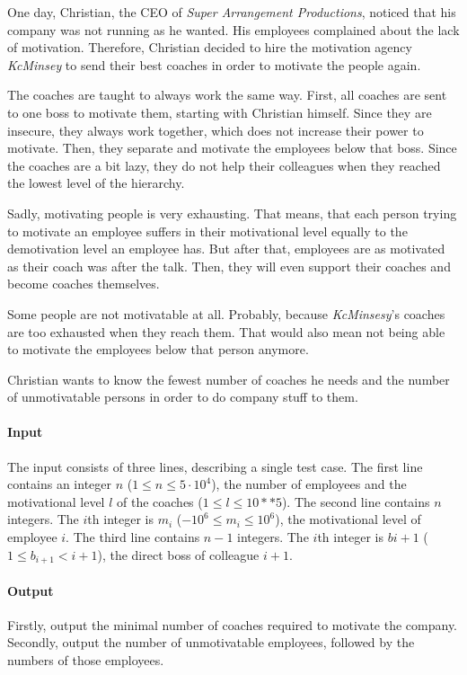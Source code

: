 



\makeheader

One day, Christian, the CEO of \textit{Super Arrangement Productions}, noticed that his company
was not running as he wanted. His employees complained about the lack of motivation.
Therefore, Christian decided to hire the motivation agency \textit{KcMinsey} to send their best
coaches in order to motivate the people again.

The coaches are taught to always work the same way. First, all coaches are sent to one boss to
motivate them, starting with Christian himself. Since they are insecure, they always work together,
which does not increase their power to motivate.
Then, they separate and motivate the employees below that boss. Since the coaches are a bit lazy,
they do not help their colleagues when they reached the lowest level of the hierarchy.

Sadly, motivating people is very exhausting. That means, that each person trying to motivate
an employee suffers in their motivational level equally to the demotivation level an employee
has. But after that, employees are as motivated as their coach was after the talk. Then,
they will even support their coaches and become coaches themselves.

Some people are not motivatable at all. Probably, because \textit{KcMinsesy}'s coaches
are too exhausted when they reach them. That would also mean not being able to motivate the
employees below that person anymore.

Christian wants to know the fewest number of coaches he needs and the number
of unmotivatable persons in order to do company stuff to them.

\paragraph*{Input}

The input consists of three lines, describing a single test case.
The first line contains an integer $n$ ($1 \leq n \leq 5 \cdot 10^4$), the number of employees and the motivational level $l$ of the coaches ($1 \leq l \leq 10**5$).
The second line contains $n$ integers. The $i$th integer is $m_i$ ($-10^6 \leq m_i \leq 10^6$), the motivational level of employee $i$.
The third line contains $n - 1$ integers. The $i$th integer is $bi+1$ ($1 \leq b_{i+1} < i + 1$), the direct boss of colleague $i + 1$.

\paragraph*{Output}

Firstly, output the minimal number of coaches required to motivate the company.
Secondly, output the number of unmotivatable employees, followed by the numbers of those employees.


\begin{samples}
\end{samples}


